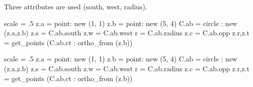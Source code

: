 Three attributes are used (south, west, radius).  

\begin{minipage}{0.5\textwidth}
\begin{tkzexample}[latex=0cm,small,code only]
\begin{tkzelements}
   scale = .5
   z.a   = point: new (1, 1)
   z.b   = point: new (5, 4)
   C.ab  = circle : new (z.a,z.b)
   z.s   = C.ab.south
   z.w   = C.ab.west
   r     = C.ab.radius
   z.c   = C.ab.opp
   z.r,z.t = get_points (C.ab.ct : ortho_from (z.b))
\end{tkzelements}
\end{tkzexample}
\end{minipage}
\begin{minipage}{0.5\textwidth}
\begin{tkzelements}
   scale = .5
   z.a = point: new (1, 1)
   z.b = point: new (5, 4)
   C.ab = circle : new (z.a,z.b)
   z.s = C.ab.south
   z.w = C.ab.west
   r   = C.ab.radius
   z.c   = C.ab.opp
   z.r,z.t = get_points (C.ab.ct : ortho_from (z.b))
\end{tkzelements}
\hspace*{\fill}
\hspace*{\fill}
\end{minipage}

\newpage
